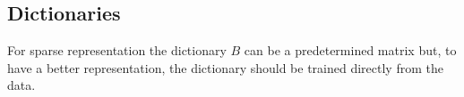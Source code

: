 \subsection{Dictionaries}

For sparse representation the dictionary $B$ can be a predetermined matrix but, to have a better representation, the dictionary should be trained directly from the data. 








